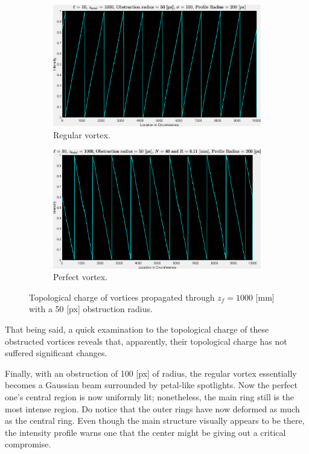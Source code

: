 \begin{figure}[htbp]
    \centering
    \begin{subfigure}[b]{0.45\textwidth}
        \centering
        \includegraphics[width=\textwidth]{images/c04/type=0_r=50_zi=0_zf=1000_TC.eps}
        \caption{Regular vortex.}
    \end{subfigure}
    \hfill
    \begin{subfigure}[b]{0.45\textwidth}
        \centering
        \includegraphics[width=\textwidth]{images/c04/type=1_r=50_zi=0_zf=1000_TC.eps}
        \caption{Perfect vortex.}
    \end{subfigure}
    \caption{Topological charge of vortices propagated through $z_f = 1000$ [mm] with a 50 [px] obstruction radius.}
    \label{fig:Vortices_r=50_z=1000_TC}
\end{figure}

That being said, a quick examination to the topological charge of these obstructed vortices reveals that, apparently, their topological charge has not suffered significant changes.

Finally, with an obstruction of 100 [px] of radius, the regular vortex essentially becomes a Gaussian beam surrounded by petal-like spotlights. Now the perfect one's central region is now uniformly lit; nonetheless, the main ring still is the most intense region. Do notice that the outer rings have now deformed as much as the central ring. Even though the main structure visually appears to be there, the intensity profile warns one that the center might be giving out a critical compromise.

